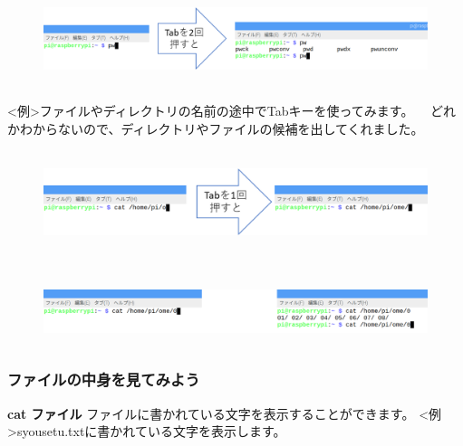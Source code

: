 \documentclass[a4paper,dvipdfmx]{jarticle}
\begin{document}
\begin{figure}
\centering
\includegraphics[width=17.006cm,height=2.76cm]{text03-img/text03-img012.png}
\end{figure}
{\textless}例{\textgreater}ファイルやディレクトリの名前の途中でTabキーを使ってみます。\newline
\ \ どれかわからないので、ディレクトリやファイルの候補を出してくれました。

\begin{figure}
\centering
\includegraphics[width=17.006cm,height=3.002cm]{text03-img/text03-img013.png}
\end{figure}
\subsubsection[]{}
\begin{figure}
\centering
\includegraphics[width=17.006cm,height=1.949cm]{text03-img/text03-img014.png}
\end{figure}
\subsubsection{}
\subsubsection{}
\clearpage\subsubsection{ファイルの中身を見てみよう}
\textbf{cat ファイル}\newline
ファイルに書かれている文字を表示することができます。\newline
{\textless}例{\textgreater}syousetu.txtに書かれている文字を表示します。
\end{document}
